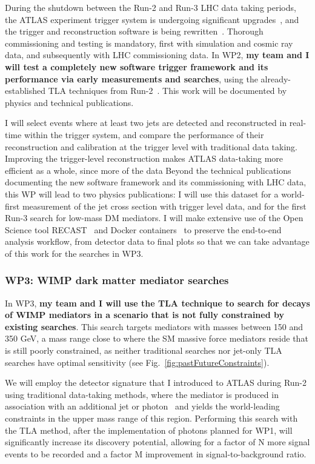 \documentclass[11pt,a4paper]{article}
\begin{document}
During the shutdown between the Run-2 and Run-3 LHC data taking periods, the ATLAS experiment trigger system is undergoing significant upgrades~\cite{FEXes}, and the trigger and reconstruction software is being rewritten~\cite{MT}. 
Thorough commissioning and testing is mandatory, first with simulation and cosmic ray data, and subsequently with LHC commissioning data. 
In WP2, \textbf{my team and I will test a completely new software trigger framework and its performance via early measurements and searches}, using the already-established TLA techniques from Run-2~\cite{TLAPRL}. This work will be documented by physics and technical publications.  

I will select events where at least two jets are detected and reconstructed in real-time within the trigger system, and compare the performance of their reconstruction and calibration at the trigger level with traditional data taking. 
Improving the trigger-level reconstruction makes ATLAS data-taking more efficient as a whole, since more of the data  
Beyond the technical publications documenting the new software framework and its commissioning with LHC data, this WP will lead to two physics publications:  
I will use this dataset for a world-first measurement of the jet cross section with trigger level data, and for the first Run-3 search for low-mass DM mediators. 
I will make extensive use of the Open Science tool RECAST~\cite{RECAST} and Docker containers~\cite{Docker} to preserve the end-to-end analysis workflow, from detector data to final plots so that we can take advantage of this work for the searches in WP3.  

\subsubsection*{WP3: WIMP dark matter mediator searches}

In WP3, \textbf{my team and I will use the TLA technique to search for decays of WIMP mediators in a scenario that is not fully constrained by existing searches}.
This search targets mediators with masses between 150 and 350 GeV, a mass range close to where the SM massive force mediators reside that is still poorly constrained, as neither traditional searches nor jet-only TLA searches have optimal sensitivity (see Fig.~\ref{fig:pastFutureConstraints}).  

We will employ the detector signature that I introduced to ATLAS during Run-2 using traditional data-taking methods, where the mediator is produced in association with an additional jet or photon~\cite{DijetISR} and yields the world-leading constraints in the upper mass range of this region. 
Performing this search with the TLA method, after the implementation of photons planned for WP1, will significantly increase its discovery potential, 
allowing for a factor of \color{red}N \color{black} more signal events to be recorded and a factor \color{red}M \color{black} improvement in signal-to-background ratio. 
\end{document}
